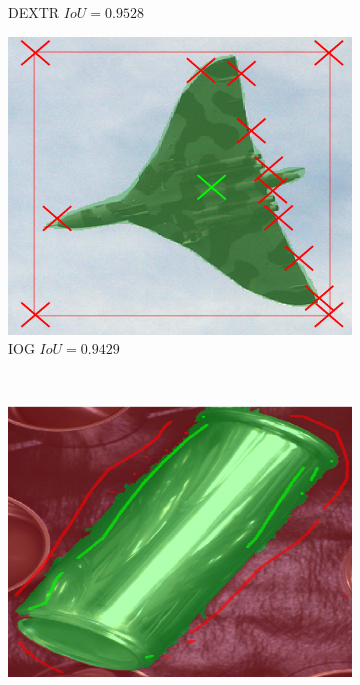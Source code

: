 \begin{figure}
\begin{subfigure}[t]{0.3\textwidth}
		\caption{
			DEXTR $ IoU = 0.9528 $
		}
	\end{subfigure}
	\hfill
	\begin{subfigure}[t]{0.3\textwidth}
		\centering
		\includegraphics[width=\textwidth]{figures/appendix/method_predictions/jet4_iog.png}
		\caption{
			IOG $ IoU = 0.9429 $
		}
	\end{subfigure}
	\\	
	\begin{subfigure}[t]{0.3\textwidth}
		\centering
		\includegraphics[width=\textwidth]{figures/appendix/method_predictions/cans75_watershed.png}

\end{subfigure}
\end{figure}
